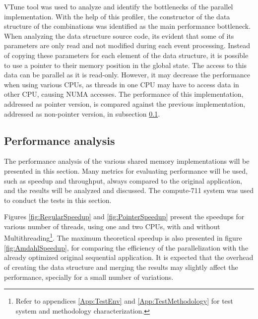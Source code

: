 \intel VTune tool was used to analyze and identify the bottlenecks of the parallel implementation. With the help of this profiler, the constructor of the data structure of the combinations was identified as the main performance bottleneck. When analyzing the data structure source code, its evident that some of its parameters are only read and not modified during each event processing. Instead of copying these parameters for each element of the data structure, it is possible to use a pointer to their memory position in the global state. The access to this data can be parallel as it is read-only. However, it may decrease the performance when using various CPUs, as threads in one CPU may have to access data in other CPU, causing NUMA accesses. The performance of this implementation, addressed as pointer version, is compared against the previous implementation, addressed as non-pointer version, in subsection \ref{SharedMemPerformance}.

\subsection{Performance analysis}
\label{SharedMemPerformance}

The performance analysis of the various shared memory implementations will be presented in this section. Many metrics for evaluating performance will be used, such as speedup and throughput, always compared to the original application, and the results will be analyzed and discussed. The compute-711 system was used to conduct the tests in this section.

Figures \ref{fig:RegularSpeedup} and \ref{fig:PointerSpeedup} present the speedups for various number of threads, using one and two CPUs, with and without Multithreading\footnote{Refer to appendices \ref{App:TestEnv} and \ref{App:TestMethodology} for test system and methodology characterization.}. The maximum theoretical speedup is also presented in figure \ref{fig:AmdahlSpeedup}, for comparing the efficiency of the parallelization with the already optimized original sequential application. It is expected that the overhead of creating the data structure and merging the results may slightly affect the performance, specially for a small number of variations.


